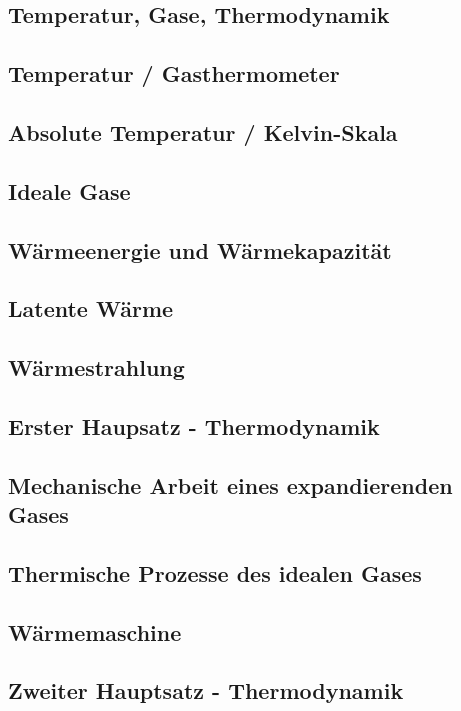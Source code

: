 \documentclass[7pt]{article}
\begin{document}
\begin{multicols*}{3}

\section{Temperatur, Gase,    Thermodynamik}
\subsection{Temperatur / Gasthermometer}




\subsection{Absolute Temperatur / Kelvin-Skala}

\subsection{Ideale Gase}

\subsection{W{\"a}rmeenergie und W{\"a}rmekapazit{\"a}t}

\subsection{Latente W{\"a}rme}

\subsection{W{\"a}rmestrahlung}

\subsection{Erster Haupsatz - Thermodynamik}

\subsection{Mechanische Arbeit eines expandierenden Gases}

\subsection{Thermische Prozesse des idealen Gases}

\subsection{W{\"a}rmemaschine}

\subsection{Zweiter Hauptsatz - Thermodynamik}


\end{multicols*}
\end{document}
